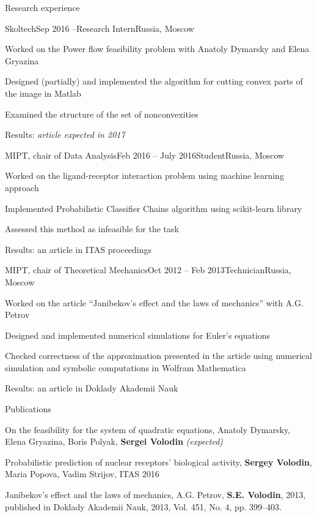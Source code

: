 \documentclass{resume} %
\begin{document}
\begin{rSection}{Research experience}
	\begin{rSubsection}{Skoltech}{Sep 2016 --}{Research Intern}{Russia, Moscow}
		\item Worked on the Power flow feasibility problem with Anatoly Dymarsky and Elena Gryazina
		\item Designed (partially) and implemented the algorithm for cutting convex parts of the image in Matlab
		\item Examined the structure of the set of nonconvexities
		\item Results: \em article expected in 2017
	\end{rSubsection}
	
	\begin{rSubsection}{MIPT, chair of Data Analysis}{Feb 2016 -- July 2016}{Student}{Russia, Moscow}
		\item Worked on the ligand-receptor interaction problem using machine learning approach
		\item Implemented Probabilistic Classifier Chains algorithm using scikit-learn library
		\item Assessed this method as infeasible for the task
		\item Results: an article in ITAS proceedings
	\end{rSubsection}
	
	\begin{rSubsection}{MIPT, chair of Theoretical Mechanics}{Oct 2012 -- Feb 2013}{Technician}{Russia, Moscow}
		\item Worked on the article ``Janibekov's effect and the laws of mechanics'' with A.G. Petrov
		\item Designed and implemented numerical simulations for Euler's equations
		\item Checked correctness of the approximation presented in the article using numerical simulation and symbolic computations in Wolfram Mathematica
		\item Results: an article in Doklady Akademii Nauk
	\end{rSubsection}
\end{rSection}


\begin{rSection}{Publications}
\item On the feasibility for the system of quadratic equations, Anatoly Dymarsky, Elena Gryazina, Boris Polyak, {\bf Sergei Volodin} {\em (expected)}
\item Probabilistic prediction of nuclear receptors’ biological activity, {\bf Sergey Volodin}, Maria Popova, Vadim Strijov, ITAS 2016
\item Janibekov’s effect and the laws of mechanics, A.G. Petrov, {\bf S.E. Volodin}, 2013, published in Doklady Akademii Nauk, 2013, Vol. 451, No. 4, pp. 399–403.
\end{rSection}
\end{document}
